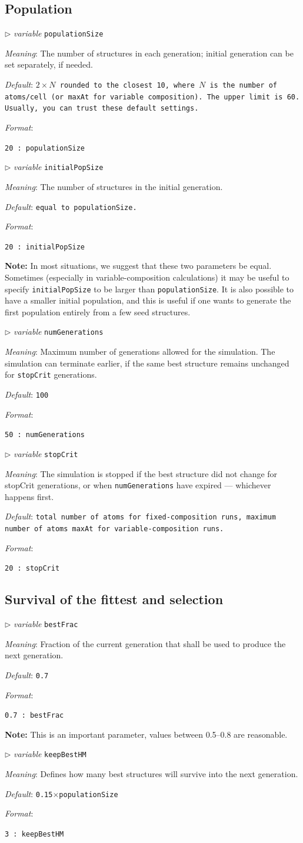 \documentclass[12pt]{article}
\newcommand{\keyword}[1]{\texttt{#1}}
\newcommand{\paramacro}[6]{
\vspace{0.5cm}
$\triangleright$ \emph{variable} {\color{blue} \texttt{#1}}

\emph{Meaning}: {#2}

{#3}

\emph{Default}: \texttt{#4}

\emph{Format}:

{\addtolength{\leftskip}{10mm} 
\texttt{#5}
\par}


{\small #6}

}
\begin{document}
\subsection{Population}

\paramacro{populationSize}{The number of structures in each generation; initial
generation can be set separately, if needed.}{}{\rm $2 \times N$ rounded to the
closest 10, where $N$ is the number of atoms/cell (or \keyword{maxAt} for
variable composition). The upper limit is 60. Usually, you can trust these
default settings.}{20 : populationSize}{}


\paramacro{initialPopSize}{The number of structures in the initial generation.}{
}{\rm equal to \keyword{populationSize}.}{20 : initialPopSize}{
\textbf{Note:}
In most situations, we suggest that these two parameters be equal. Sometimes
(especially in variable-composition calculations) it may be useful to specify
\keyword{initialPopSize} to be larger than \keyword{populationSize}. It is also
possible to have a smaller initial population, and this is useful if one wants
to generate the first population entirely from a few seed structures.}


\paramacro{numGenerations}{Maximum number of generations allowed for the
simulation. The simulation can terminate earlier, if the same best structure
remains unchanged for \keyword{stopCrit} generations.}{}{100}{50 :
numGenerations}{}


\paramacro{stopCrit}{The simulation is stopped if the best structure did not
change for stopCrit generations, or when \keyword{numGenerations} have expired
--- whichever happens first.}{}{\rm total number of atoms for fixed-composition
runs, maximum number of atoms \keyword{maxAt} for variable-composition runs.}{20
: stopCrit}{}

\subsection{Survival of the fittest and selection}


\paramacro{bestFrac}{Fraction of the current generation that shall be used to
produce the next generation.}{}{0.7}{0.7 : bestFrac}{\textbf{Note:} This is an
important parameter, values between 0.5--0.8 are reasonable.}


\paramacro{keepBestHM}{Defines how many best structures will survive into the
next generation.}{}{0.15$\times$\keyword{populationSize}}{3 : keepBestHM}{}
\end{document}
